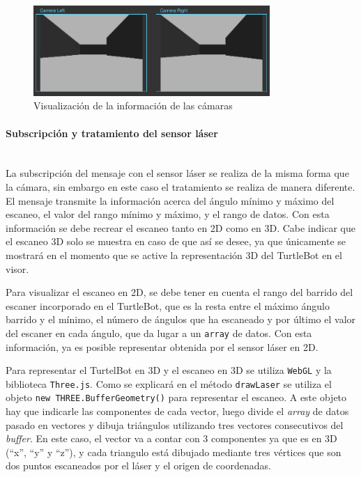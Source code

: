 \begin{figure}[H]
  \begin{center}
    \includegraphics[width=0.8\textwidth]{figures/camarasturtle.png}
		\caption{Visualización de la información de las cámaras}
		\label{fig.camarasturtle}
		\end{center}
\end{figure}

\paragraph{Subscripción y tratamiento del sensor láser} \hspace{0pt}  \\

La subscripción del mensaje con el sensor láser se realiza de la misma forma que la cámara, sin embargo en este caso el tratamiento se realiza de manera diferente. El mensaje transmite la información acerca del ángulo mínimo y máximo del escaneo, el valor del rango mínimo y máximo, y el rango de datos. Con esta información se debe recrear el escaneo tanto en 2D como en 3D. Cabe indicar que el escaneo 3D solo se muestra en caso de que así se desee, ya que únicamente se mostrará en el momento que se active la representación 3D del TurtleBot en el visor.

Para visualizar el escaneo en 2D, se debe tener en cuenta el rango del barrido del escaner incorporado en el TurtleBot, que es la resta entre el máximo ángulo barrido y el mínimo, el número de ángulos que ha escaneado y por último el valor del escaner en cada ángulo, que da lugar a un \texttt{array} de datos. Con esta información, ya es posible representar obtenida por el sensor láser en 2D.

Para representar el TurtelBot en 3D y el escaneo en 3D se utiliza \texttt{WebGL} y la biblioteca \texttt{Three.js}. Como se explicará en el método \texttt{drawLaser} se utiliza el objeto \texttt{new THREE.BufferGeometry()} para representar el escaneo. A este objeto hay que indicarle las componentes de cada vector, luego divide el \textit{array} de datos pasado en vectores y dibuja triángulos utilizando tres vectores consecutivos del \textit{buffer}. En este caso, el vector va a contar con 3 componentes ya que es en 3D (``x'', ``y'' y ``z''), y cada triangulo está dibujado mediante tres vértices que son dos puntos escaneados por el láser y el origen de coordenadas.

